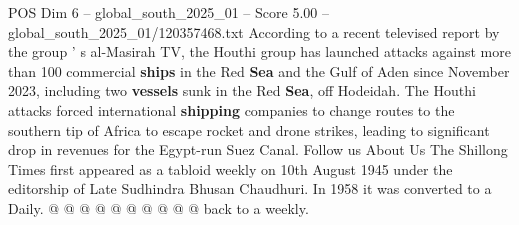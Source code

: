 \begin{textsample}{POS Dim 6 – global\_south\_2025\_01 – Score 5.00 – global\_south\_2025\_01/120357468.txt}
According to a recent televised report by the group ' s al-Masirah TV, the Houthi group has launched attacks against more than 100 commercial \textbf{ships} in the Red \textbf{Sea} and the Gulf of Aden since November 2023, including two \textbf{vessels} sunk in the Red \textbf{Sea}, off Hodeidah.
The Houthi attacks forced international \textbf{shipping} companies to change routes to the southern tip of Africa to escape rocket and drone strikes, leading to significant drop in revenues for the Egypt-run Suez Canal.
Follow us About Us The Shillong Times first appeared as a tabloid weekly on 10th August 1945 under the editorship of Late Sudhindra Bhusan Chaudhuri.
In 1958 it was converted to a Daily. @ @ @ @ @ @ @ @ @ @ back to a weekly.

\end{textsample}
